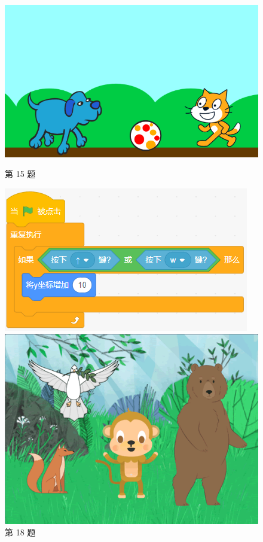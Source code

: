 \documentclass[10pt, a4paper]{article}
\begin{document}
\begin{enumerate}
        \begin{figure}[htbp]
            \centering
            \begin{minipage}[t]{.25\textwidth}
                \centering
                \includegraphics[width=\textwidth]{figure/15.png}
                \caption*{第 15 题}
            \end{minipage}
            \begin{minipage}[t]{.255\textwidth}
                \centering
                \includegraphics[width=\textwidth]{figure/18.png}
                \caption*{第 18 题}
            \end{minipage}
            \begin{minipage}[t]{.2\textwidth}
                \centering
                \includegraphics[width=\textwidth]{figure/19.png}

\end{minipage}
\end{figure}
\end{enumerate}
\end{document}

